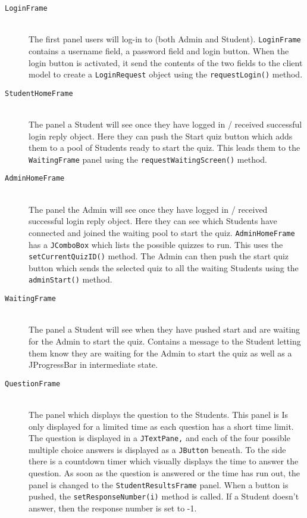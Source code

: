 \begin{enumerate}
	\begin{description}

		\item[\texttt{LoginFrame}]\hfill \\ The first panel users will log-in
			to (both Admin and Student). \texttt{LoginFrame} contains a
			username field, a password field and login button. When the login
			button is activated, it send the contents of the two fields to the
			client model to create a \texttt{LoginRequest} object using the
			\verb+requestLogin()+ method.

		\item[\texttt{StudentHomeFrame}]\hfill \\ The panel a Student will see
			once they have logged in / received successful login reply object.
			Here they can push the Start quiz button which adds them to a pool
			of Students ready to start the quiz. This leads them to the
			\texttt{WaitingFrame} panel using the
			\verb+requestWaitingScreen()+ method.

		\item[\texttt{AdminHomeFrame}]\hfill \\ The panel the Admin will see
			once they have logged in / received successful login reply object.
			Here they can see which Students have connected and joined the
			waiting pool to start the quiz. \texttt{AdminHomeFrame} has a
			\texttt{JComboBox} which lists the possible quizzes to run. This
			uses the \verb+setCurrentQuizID()+ method. The Admin can then
			push the start quiz button which sends the selected quiz to all the
			waiting Students using the \verb+adminStart()+ method.

		\item[\texttt{WaitingFrame}]\hfill \\ The panel a Student will see when
			they have pushed start and are waiting for the Admin to start
			the quiz. Contains a message to the Student letting them know
			they are waiting for the Admin to start the quiz as well as a
			JProgressBar in intermediate state.

		\item[\texttt{QuestionFrame}]\hfill \\ The panel which displays the
			question to the Students. This panel is Is only displayed for a
			limited time as each question has a short time limit. The question
			is displayed in a \texttt{JTextPane,} and each of the four possible
			multiple choice answers is displayed as a \texttt{JButton} beneath.
			To the side there is a countdown timer which visually displays the
			time to answer the question. As soon as the question is answered or
			the time has run out, the panel is changed to the
			\texttt{StudentResultsFrame} panel. When a button is pushed, the
			\verb+setResponseNumber(i)+ method is called. If a Student
			doesn't answer, then the response number is set to -1.


\end{description}
\end{enumerate}
